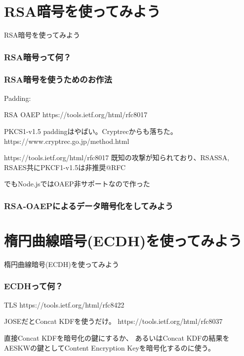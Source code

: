 \documentclass[12pt,dvipdfmx]{beamer}
\begin{document}
\section{RSA暗号を使ってみよう}
\begin{frame}
\centering
{\Large RSA暗号を使ってみよう}
\end{frame}

\begin{frametitle}
\frametitle{RSA暗号って何？}
\end{frametitle}

\begin{frame}
\frametitle{RSA暗号を使うためのお作法}
Padding:

RSA OAEP
https://tools.ietf.org/html/rfc8017

PKCS1-v1.5 paddingはやばい。Cryptrecからも落ちた。
https://www.cryptrec.go.jp/method.html

https://tools.ietf.org/html/rfc8017
既知の攻撃が知られており、RSASSA, RSAES共にPKCF1-v1.5は非推奨@RFC

でもNode.jsではOAEP非サポートなので作った
\end{frame}

\begin{frame}
\frametitle{RSA-OAEPによるデータ暗号化をしてみよう}
\end{frame}


\section{楕円曲線暗号(ECDH)を使ってみよう}
\begin{frame}
\centering
{\Large 楕円曲線暗号(ECDH)を使ってみよう}
\end{frame}

\begin{frame}
\frametitle{ECDHって何？}
TLS https://tools.ietf.org/html/rfc8422

JOSEだとConcat KDFを使うだけ。
https://tools.ietf.org/html/rfc8037

直接Concat KDFを暗号化の鍵にするか、
あるいはConcat KDFの結果をAESKWの鍵としてContent Encryption Keyを暗号化するのに使う。

\end{frame}
\end{document}

